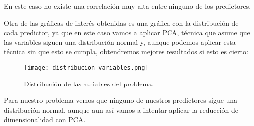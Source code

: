 En este caso no existe una correlación muy alta entre ninguno de los predictores.

Otra de las gráficas de interés obtenidas es una gráfica con la distribución de cada predictor, ya que en este caso vamos a aplicar PCA, técnica que asume que las variables siguen una distribución normal y, aunque podemos aplicar esta técnica sin que esto se cumpla, obtendremos mejores resultados si esto es cierto:

\begin{figure}[H]
	\centering
	\texttt{[image: distribucion\_variables.png]}
	\caption{Distribución de las variables del problema.}
	\label{fig:distribucion_variables}
\end{figure}

Para nuestro problema vemos que ninguno de nuestros predictores sigue una distribución normal, aunque aun así vamos a intentar aplicar la reducción de dimensionalidad con PCA.



\newpage
